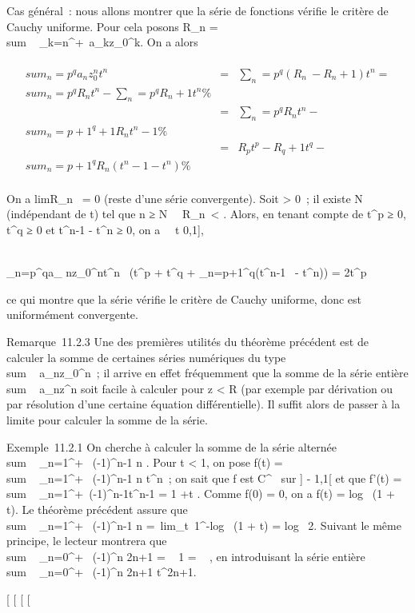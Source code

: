 \documentclass[]{article}
\begin{document}
Cas général~: nous allons montrer que la série de fonctions vérifie le
critère de Cauchy uniforme. Pour cela posons R_n
= \\sum ~
_k=n^+\infty~a_kz_0^k. On a alors

\begin{align*} \\sum
_n=p^qa_ nz_0^nt^n&
=& \sum _n=p^q(R_ n~ -
R_n+1)t^n = \\sum
_n=p^qR_ nt^n
-\sum _n=p^qR_
n+1t^n\%& \\ & =&
\sum _n=p^qR_
nt^n -\\sum
_n=p+1^q+1R_ nt^n-1 \%&
\\ & =& R_pt^p -
R_ q+1t^q -\\sum
_n=p+1^qR_ n(t^n-1 - t^n)
\%& \\ \end{align*}

On a limR_n~ = 0 (reste d'une série
convergente). Soit \epsilon \textgreater{} 0~; il existe N \in {}~ (indépendant de
t) tel que n ≥ N \rigtharrow~\
R_n\ \textless{} \epsilon
{} . Alors, en tenant compte de t^p ≥
0, t^q ≥ 0 et t^n-1 - t^n ≥ 0, on a
\forall~~t \in {[}0,1{]},

\\\sum
_n=p^qa_
nz_0^nt^n\ \leq \epsilon
{} (t^p + t^q +
\sum _n=p+1^q(t^n-1~ -
t^n)) = 2t^p \epsilon {} \leq \epsilon

ce qui montre que la série vérifie le critère de Cauchy uniforme, donc
est uniformément convergente.

Remarque~11.2.3 Une des premières utilités du théorème précédent est de
calculer la somme de certaines séries numériques du type
\\sum ~
a_nz_0^n~; il arrive en effet fréquemment que
la somme de la série entière
\\sum ~
a_nz^n soit facile à calculer pour
z \textless{} R (par exemple par dérivation ou par
résolution d'une certaine équation différentielle). Il suffit alors de
passer à la limite pour calculer la somme de la série.

Exemple~11.2.1 On cherche à calculer la somme de la série alternée
\\sum ~
_n=1^+\infty~ (-1)^n-1 \over n .
Pour t \textless{} 1, on pose f(t)
= \\sum ~
_n=1^+\infty~ (-1)^n-1 \over n
t^n~; on sait que f est C^\infty~ sur {]} - 1,1{[} et
que f'(t) = \\sum ~
_n=1^+\infty~(-1)^n-1t^n-1 = 1
+t . Comme f(0) = 0, on a f(t)
= log~ (1 + t). Le théorème précédent assure
que \\sum ~
_n=1^+\infty~ (-1)^n-1 \over n
=\
lim_t\rightarrow~1^-log~ (1 + t)
= log~ 2. Suivant le même principe, le lecteur
montrera que \\sum ~
_n=0^+\infty~ (-1)^n \over 2n+1
= \mathrmarctg~ 1 = \pi~
 , en introduisant la série entière
\\sum ~
_n=0^+\infty~ (-1)^n \over 2n+1
t^2n+1.

{[}
{[}
{[}
{[}
\end{document}
